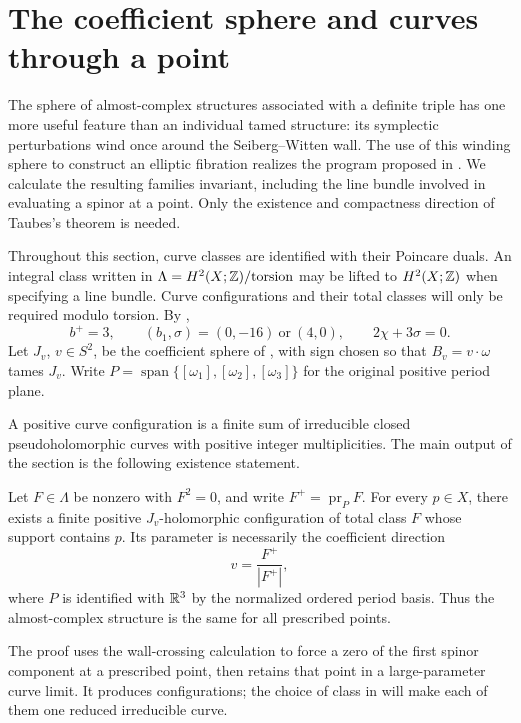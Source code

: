 \section{The coefficient sphere and curves through a point}
\label{sec:families}

The sphere of almost-complex structures associated with a definite triple
has one more useful feature than an individual tamed structure: its
symplectic perturbations wind once around the Seiberg--Witten wall.
The use of this winding sphere to construct an elliptic fibration
realizes the program proposed in \cite[Section~7.4.1]{Li2010SCY}.
We calculate the resulting families invariant, including the line bundle
involved in evaluating a spinor at a point.  Only the existence and
compactness direction of Taubes's theorem is needed.

Throughout this section, curve classes are identified with their
Poincare duals.  An integral class written in
\(\Lambda=H^2(X;\mathbb Z)/\mathrm{torsion}\) may be lifted to
\(H^2(X;\mathbb Z)\) when specifying a line bundle.  Curve configurations and
their total classes will only be required modulo torsion.
By ,
\begin{equation}
 \label{eq:families-topology}
 b^+=3,\qquad
 (b_1,\sigma)=(0,-16)\ \text{or}\ (4,0),\qquad
 2\chi+3\sigma=0.
\end{equation}
Let \(J_v\), \(v\in S^2\), be the coefficient sphere of
, with sign chosen so that
\(B_v=v\cdot\omega\) tames \(J_v\).  Write
\(P=\operatorname{span}\{[\omega_1],[\omega_2],[\omega_3]\}\) for the
original positive period plane.

A positive curve configuration is a finite sum of irreducible closed
pseudoholomorphic curves with positive integer multiplicities.  The
main output of the section is the following existence statement.

\begin{theorem}
 \label{thm:family-curves}
 Let \(F\in\Lambda\) be nonzero with \(F^2=0\), and write
 \(F^+=\operatorname{pr}_P F\).  For every \(p\in X\),
 there exists a finite positive \(J_v\)-holomorphic configuration
 of total class \(F\) whose support contains \(p\).
 Its parameter is necessarily the coefficient direction
 \[
  v=\frac{F^+}{|F^+|},
 \]
 where \(P\) is identified with \(\mathbb R^3\) by the normalized
 ordered period basis.  Thus the almost-complex structure is the
 same for all prescribed points.
\end{theorem}

The proof uses the wall-crossing calculation to force a zero of the
first spinor component at a prescribed point, then retains that point
in a large-parameter curve limit.  It produces configurations; the
choice of class in  will make each of them
one reduced irreducible curve.

